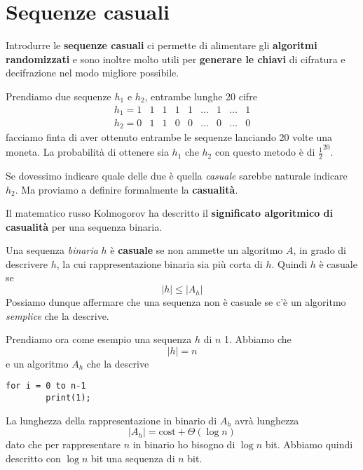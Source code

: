 \chapter{Sequenze casuali}\label{casualita}
Introdurre le \textbf{sequenze casuali} ci permette di alimentare gli \textbf{algoritmi randomizzati} e sono inoltre
molto utili per \textbf{generare le chiavi} di cifratura e decifrazione nel modo migliore possibile.

\begin{example}
	Prendiamo due sequenze $h_1$ e $h_2$, entrambe lunghe 20 cifre
	\[
		\begin{matrix}
			h_1 = 1 & 1 & 1 & 1 & 1 & \dots & 1 & \dots & 1 \\
			h_2 = 0 & 1 & 1 & 0 & 0 & \dots & 0 & \dots & 0
		\end{matrix}
	\]
	facciamo finta di aver ottenuto entrambe le sequenze lanciando 20 volte una moneta. La probabilit\`a di ottenere sia
	$h_1$ che $h_2$ con questo metodo \`e di $\frac{1}{2}^{20}$.

	Se dovessimo indicare quale delle due \`e quella \emph{casuale} sarebbe naturale indicare $h_2$. Ma proviamo a definire
	formalmente la \textbf{casualit\`a}.
\end{example}

Il matematico russo Kolmogorov ha descritto il \textbf{significato algoritmico di casualit\`a} per una sequenza binaria.

\begin{definition}[Kolmogorov]
	Una sequenza \emph{binaria} $h$ \`e \textbf{casuale} se non ammette un algoritmo $A$, in grado di descrivere $h$, la
	cui rappresentazione binaria sia pi\`u corta di $h$. Quindi $h$ \`e casuale se
	\[ |h| \leq |A_h| \]
	Possiamo dunque affermare che una sequenza non \`e casuale se c'\`e un algoritmo \emph{semplice} che la descrive.
\end{definition}

\begin{example}
	Prendiamo ora come esempio una sequenza $h$ di $n$ 1. Abbiamo che
	\[ |h| = n \]
	e un algoritmo $A_h$ che la descrive
	\begin{lstlisting}[style=pseudo-style]
	for i = 0 to n-1
		print(1);
	\end{lstlisting}
	La lunghezza della rappresentazione in binario di $A_h$ avr\`a lunghezza
	\[ |A_h| = \text{cost} + \Theta(\log n) \]
	dato che per rappresentare $n$ in binario ho bisogno di $\log n$ bit. Abbiamo quindi descritto con $\log n$	bit
	una sequenza di $n$ bit.
\end{example}

